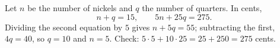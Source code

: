 Let $n$ be the number of nickels and $q$ the number of quarters. In cents,
\[
n+q=15,\qquad 5n+25q=275 .
\]
Dividing the second equation by $5$ gives $n+5q=55$; subtracting the first, $4q=40$, so $q=10$ and $n=\boxed{5}$. Check: $5\cdot5+10\cdot25=25+250=275$ cents.
